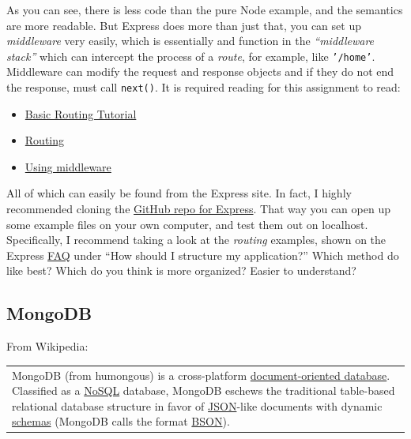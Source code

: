 As you can see, there is less code than the pure Node example, and the semantics
are more readable. But Express does more than just that, you can set up 
\textit{middleware} very easily, which is essentially and function in the
\textit{``middleware stack''} which can intercept the process of a \textit{route},
for example, like \texttt{'/home'}. Middleware can modify the request and response
objects and if they do not end the response, must call \texttt{next()}. 
It is required reading for this assignment to read:

\begin{itemize}
    \item \href{http://expressjs.com/starter/basic-routing.html}{Basic Routing Tutorial}
    \item \href{http://expressjs.com/guide/routing.html}{Routing}
    \item \href{http://expressjs.com/guide/using-middleware.html}{Using middleware}
\end{itemize}

All of which can easily be found from the Express site. In fact, I highly recommended
cloning the \href{https://github.com/strongloop/express}{GitHub repo for Express}.
That way you can open up some example files on your own computer, and test them out on
localhost. Specifically, I recommend taking a look at the \textit{routing} examples, shown
on the Express \href{http://expressjs.com/starter/faq.html}{FAQ} under ``How should I structure
my application?'' Which method do like best? Which do you think is more organized? Easier to 
understand?

\subsection{MongoDB}

From Wikipedia:

\begin{tabular}{p{}} 
    MongoDB (from humongous) is a cross-platform \href{http://en.wikipedia.org/wiki/Document-oriented_database}{document-oriented database}.
    Classified as a \href{http://en.wikipedia.org/wiki/NoSQL}{NoSQL} database, 
    MongoDB eschews the traditional table-based relational database structure 
    in favor of \href{http://en.wikipedia.org/wiki/JSON}{JSON}-like documents 
    with dynamic \href{http://en.wikipedia.org/wiki/Database_schema}{schemas} 
    (MongoDB calls the format \href{http://en.wikipedia.org/wiki/BSON}{BSON}).
\end{tabular}\\

